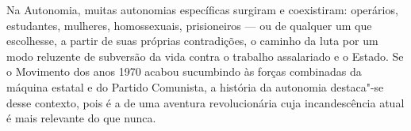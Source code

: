 Na Autonomia, muitas autonomias específicas surgiram e coexistiram: operários, estudantes, mulheres, homossexuais, prisioneiros --- ou de qualquer um que escolhesse, a partir de suas próprias contradições, o caminho da luta por um modo reluzente de subversão da vida contra o trabalho assalariado e o Estado. Se o Movimento dos anos 1970 acabou sucumbindo às forças combinadas da máquina estatal e do Partido Comunista, a história da autonomia destaca"-se desse contexto, pois é a de uma aventura revolucionária cuja incandescência atual é mais relevante do que nunca. 

\vfill

\hspace*{-.4cm}\begin{minipage}[c]{.5\linewidth}
\small{
{}}
\end{minipage}

\pagebreak
\pagestyle{n-1cat}

